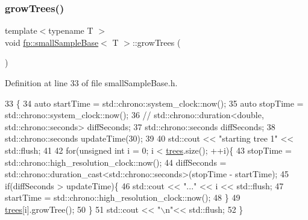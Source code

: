 \subsubsection{\texorpdfstring{grow\+Trees()}{growTrees()}}
{\footnotesize\ttfamily template$<$typename T $>$ \\
void \hyperlink{classfp_1_1smallSampleBase}{fp\+::small\+Sample\+Base}$<$ T $>$\+::grow\+Trees (\begin{DoxyParamCaption}{ }\end{DoxyParamCaption})\hspace{0.3cm}{\ttfamily [inline]}}



Definition at line 33 of file small\+Sample\+Base.\+h.


\begin{DoxyCode}
33                             \{
34                 \textcolor{keyword}{auto} startTime = std::chrono::system\_clock::now();
35                 \textcolor{keyword}{auto} stopTime = std::chrono::system\_clock::now();
36                 \textcolor{comment}{//  std::chrono::duration<double, std::chrono::seconds> diffSeconds;}
37                 std::chrono::seconds diffSeconds;
38                 std::chrono::seconds updateTime(30);
39 
40                 std::cout << \textcolor{stringliteral}{"starting tree 1"} << std::flush;
41 
42                 \textcolor{keywordflow}{for}(\textcolor{keywordtype}{unsigned} \textcolor{keywordtype}{int} i = 0; i < \hyperlink{classfp_1_1smallSampleBase_a9a3d92948248f1809d9f025b553512b6}{trees}.size(); ++i)\{
43                     stopTime = std::chrono::high\_resolution\_clock::now();
44                     diffSeconds =   std::chrono::duration\_cast<std::chrono::seconds>(stopTime - startTime);
45                     \textcolor{keywordflow}{if}(diffSeconds > updateTime)\{
46                         std::cout << \textcolor{stringliteral}{"..."} << i << std::flush;
47                         startTime = std::chrono::high\_resolution\_clock::now();
48                     \}
49                     \hyperlink{classfp_1_1smallSampleBase_a9a3d92948248f1809d9f025b553512b6}{trees}[i].growTree();
50                 \}
51                 std::cout << \textcolor{stringliteral}{"\(\backslash\)n"}<< std::flush;
52             \}
\end{DoxyCode}
\mbox{\label{classfp_1_1smallSampleBase_a616b7c06887cf4a1ac919bc3846a7933}} 
